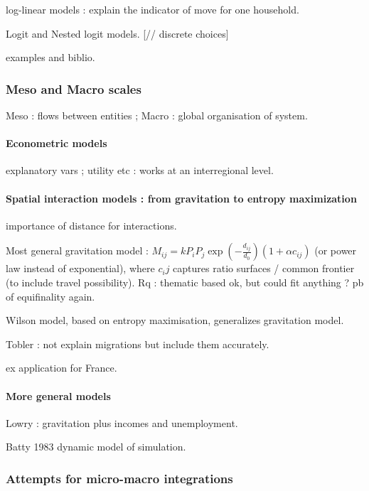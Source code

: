 log-linear models : explain the indicator of move for one household.

Logit and Nested logit models. [// discrete choices]

examples and biblio.

\subsubsection{Meso and Macro scales}

Meso : flows between entities ; Macro : global organisation of system.

\paragraph{Econometric models}

explanatory vars ; utility etc : works at an interregional level.

\paragraph{Spatial interaction models : from gravitation to entropy maximization}

importance of distance for interactions. 

Most general gravitation model : $M_{ij} = k P_i P_j \exp{(-\frac{d_{ij}}{d_0})}(1+\alpha c_{ij})$ (or power law instead of exponential), where $c_ij$ captures ratio surfaces / common frontier (to include travel possibility). Rq : thematic based ok, but could fit anything ? pb of equifinality again.

Wilson model, based on entropy maximisation, generalizes gravitation model.

Tobler : not explain migrations but include them accurately.

ex application for France.


\paragraph{More general models}

Lowry : gravitation plus incomes and unemployment.

Batty 1983 dynamic model of simulation.

\subsubsection{Attempts for micro-macro integrations}

